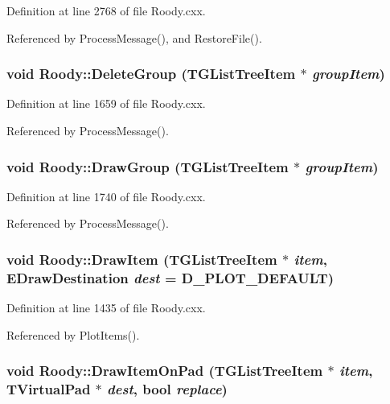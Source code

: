 Definition at line 2768 of file Roody.cxx.

Referenced by ProcessMessage(), and RestoreFile().
\subsubsection[{DeleteGroup}]{\setlength{\rightskip}{0pt plus 5cm}void Roody::DeleteGroup (TGListTreeItem $\ast$ {\em groupItem})\hspace{0.3cm}{\ttfamily  [private]}}\label{classRoody_a3d0821224c56ba268e4893d21fb15593}


Definition at line 1659 of file Roody.cxx.

Referenced by ProcessMessage().
\subsubsection[{DrawGroup}]{\setlength{\rightskip}{0pt plus 5cm}void Roody::DrawGroup (TGListTreeItem $\ast$ {\em groupItem})\hspace{0.3cm}{\ttfamily  [private]}}\label{classRoody_a545fad209cc208ef83b038cb2904e6e2}


Definition at line 1740 of file Roody.cxx.

Referenced by ProcessMessage().
\subsubsection[{DrawItem}]{\setlength{\rightskip}{0pt plus 5cm}void Roody::DrawItem (TGListTreeItem $\ast$ {\em item}, \/  {\bf EDrawDestination} {\em dest} = {\ttfamily D\_\-PLOT\_\-DEFAULT})\hspace{0.3cm}{\ttfamily  [private]}}\label{classRoody_ae5e9d0de70d56bc4fc2c3ee56ee4a2b7}


Definition at line 1435 of file Roody.cxx.

Referenced by PlotItems().
\subsubsection[{DrawItemOnPad}]{\setlength{\rightskip}{0pt plus 5cm}void Roody::DrawItemOnPad (TGListTreeItem $\ast$ {\em item}, \/  TVirtualPad $\ast$ {\em dest}, \/  bool {\em replace})\hspace{0.3cm}{\ttfamily  [private]}}\label{classRoody_aebafdb5e945ef9bad3e00bb8ddb95d94}


